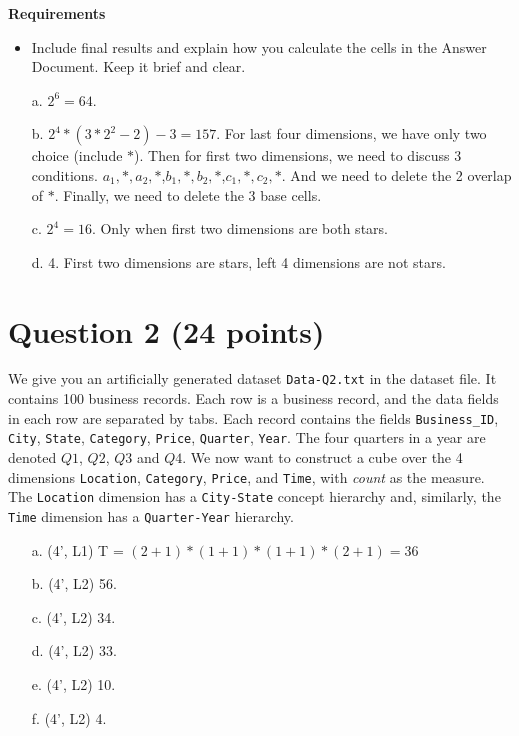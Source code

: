{\bf Requirements}
\begin{itemize}\vspace{-2mm}\setlength\itemsep{0mm}
\item Include final results and explain how you calculate the cells in the Answer Document. Keep it brief and clear.
\end{itemize}
\begin{itemize}
\item[a.]  $2^6 = 64$. 
\item[b.] $2^4 * (3*2^2 -2) -3 = 157$. For last four dimensions, we have only two choice (include $*$). Then for first two dimensions, we need to discuss 3 conditions. $a_1,*,a_2,*$,$b_1,*,b_2,*$,$c_1,*,c_2,*$. And we need to delete the 2 overlap of $*$. Finally, we need to delete the 3 base cells. 
\item[c.]  $2^4 = 16$. Only when first two dimensions are both stars. 
\item[d.]  4. First two dimensions are stars, left 4 dimensions are not stars.
\end{itemize}

\section*{Question 2 (24 points)}
We give you an artificially generated dataset \texttt{Data-Q2.txt} in the dataset file. It contains 100 business records. Each row is a business record, and the data fields in each row are separated by tabs. Each record contains the fields \texttt{Business\_ID}, \texttt{City}, \texttt{State}, \texttt{Category}, \texttt{Price}, \texttt{Quarter}, \texttt{Year}. The four quarters in a year are denoted $Q1$, $Q2$, $Q3$ and $Q4$. We now want to construct a cube over the 4 dimensions \texttt{Location}, \texttt{Category}, \texttt{Price}, and \texttt{Time}, with {\it count} as the measure. The \texttt{Location} dimension has a \texttt{City-State} concept hierarchy and, similarly, the \texttt{Time} dimension has a \texttt{Quarter-Year} hierarchy.\\
\begin{itemize}
\item[a.] (4', L1) T = $(2+1)*(1+1)*(1+1)*(2+1) = 36$
\item[b.] (4', L2) 56.
\item[c.] (4', L2) 34.
\item[d.] (4', L2) 33.
\item[e.] (4', L2) 10.
\item[f.] (4', L2) 4.
\end{itemize}


